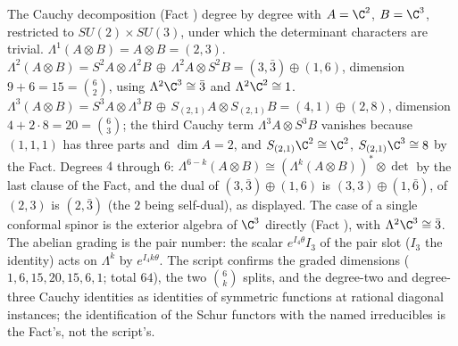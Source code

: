 The Cauchy decomposition (Fact ) degree by degree with $A = \C^{2}$, $B = \C^{3}$, restricted to $SU(2) \times SU(3)$, under which the determinant characters are trivial. $\Lambda^{1}(A \otimes B) = A \otimes B = (2,3)$. $\Lambda^{2}(A \otimes B) = S^{2}A \otimes \Lambda^{2}B \,\oplus\, \Lambda^{2}A \otimes S^{2}B = (3, \bar{3}) \oplus (1, 6)$, dimension $9 + 6 = 15 = \binom{6}{2}$, using $\Lambda^{2}\C^{3} \cong \bar{3}$ and $\Lambda^{2}\C^{2} \cong 1$. $\Lambda^{3}(A \otimes B) = S^{3}A \otimes \Lambda^{3}B \,\oplus\, S_{(2,1)}A \otimes S_{(2,1)}B = (4, 1) \oplus (2, 8)$, dimension $4 + 2\cdot 8 = 20 = \binom{6}{3}$; the third Cauchy term $\Lambda^{3}A \otimes S^{3}B$ vanishes because $(1,1,1)$ has three parts and $\dim A = 2$, and $S_{(2,1)}\C^{2} \cong \C^{2}$, $S_{(2,1)}\C^{3} \cong 8$ by the Fact. Degrees $4$ through $6$: $\Lambda^{6-k}(A \otimes B) \cong (\Lambda^{k}(A \otimes B))^{*} \otimes \det$ by the last clause of the Fact, and the dual of $(3, \bar{3}) \oplus (1, 6)$ is $(3, 3) \oplus (1, \bar{6})$, of $(2, 3)$ is $(2, \bar{3})$ (the $2$ being self-dual), as displayed. The case of a single conformal spinor is the exterior algebra of $\C^{3}$ directly (Fact ), with $\Lambda^{2}\C^{3} \cong \bar{3}$. The abelian grading is the pair number: the scalar $e^{I_{4}\theta}I_{3}$ of the pair slot ($I_{3}$ the identity) acts on $\Lambda^{k}$ by $e^{I_{4}k\theta}$. The script confirms the graded dimensions ($1, 6, 15, 20, 15, 6, 1$; total $64$), the two $\binom{6}{k}$ splits, and the degree-two and degree-three Cauchy identities as identities of symmetric functions at rational diagonal instances; the identification of the Schur functors with the named irreducibles is the Fact's, not the script's.
